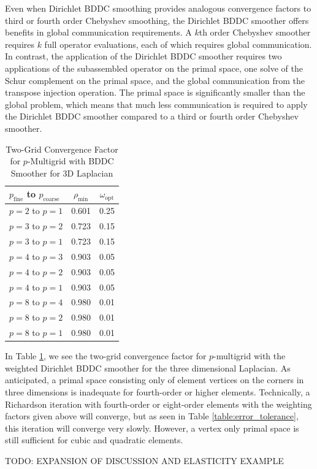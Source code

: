 Even when Dirichlet BDDC smoothing provides analogous convergence factors to third or fourth order Chebyshev smoothing, the Dirichlet BDDC smoother offers benefits in global communication requirements.
A $k$th order Chebyshev smoother requires $k$ full operator evaluations, each of which requires global communication.
In contrast, the application of the Dirichlet BDDC smoother requires two applications of the subassembled operator on the primal space, one solve of the Schur complement on the primal space, and the global communication from the transpose injection operation.
The primal space is significantly smaller than the global problem, which means that much less communication is required to apply the Dirichlet BDDC smoother compared to a third or fourth order Chebyshev smoother.

\begin{table}[ht!]
\begin{center}
\begin{tabular}{l cc}
  \toprule
  $p_{\text{fine}}$ to $p_{\text{coarse}}$  & $\rho_{\min}$ & $\omega_{\text{opt}}$  \\
  \toprule
  $p = 2$ to $p = 1$   &  0.601 & 0.25  \\
  \midrule
  $p = 3$ to $p = 2$   &  0.723 & 0.15  \\
  $p = 3$ to $p = 1$   &  0.723 & 0.15  \\
  \midrule
  $p = 4$ to $p = 3$   &  0.903 & 0.05  \\
  $p = 4$ to $p = 2$   &  0.903 & 0.05  \\
  $p = 4$ to $p = 1$   &  0.903 & 0.05  \\
  \midrule
  $p = 8$ to $p = 4$   &  0.980 & 0.01  \\
  $p = 8$ to $p = 2$   &  0.980 & 0.01  \\
  $p = 8$ to $p = 1$   &  0.980 & 0.01  \\
  \bottomrule
\end{tabular}
\end{center}
\caption{Two-Grid Convergence Factor for $p$-Multigrid with BDDC Smoother for 3D Laplacian}
\label{table:two_grid_bddc_smoother_3d}
\end{table}

In Table \ref{table:two_grid_bddc_smoother_3d}, we see the two-grid convergence factor for $p$-multigrid with the weighted Dirichlet BDDC smoother for the three dimensional Laplacian.
As anticipated, a primal space consisting only of element vertices on the corners in three dimensions is inadequate for fourth-order or higher elements.
Technically, a Richardson iteration with fourth-order or eight-order elements with the weighting factors given above will converge, but as seen in Table \ref{table:error_tolerance}, this iteration will converge very slowly.
However, a vertex only primal space is still sufficient for cubic and quadratic elements.

TODO: EXPANSION OF DISCUSSION AND ELASTICITY EXAMPLE

